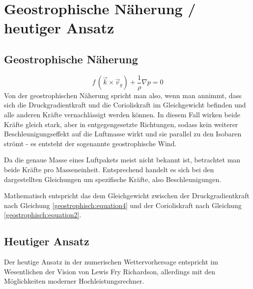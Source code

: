 %
%
%
%
\section{Geostrophische Näherung / heutiger Ansatz
\label{geostrophisch:section:geoNäherung}}
\subsection{Geostrophische Näherung}
\begin{equation}
f\, (\vec{k} \times \vec{v}_g) 
+
\frac{1}{\rho} \nabla p
=
0
\label{geostrophisch:equation5}
\end{equation}
Von der geostrophischen Näherung spricht man also, wenn man annimmt, dass sich die Druckgradientkraft und die Corioliskraft im Gleichgewicht befinden und alle anderen Kräfte vernachlässigt werden können. In diesem Fall wirken beide Kräfte gleich stark, aber in entgegengesetzte Richtungen, sodass kein weiterer Beschleunigungseffekt auf die Luftmasse wirkt und sie parallel zu den Isobaren strömt - es entsteht der sogenannte geostrophische Wind.

\vspace{1em}

Da die genaue Masse eines Luftpakets meist nicht bekannt ist, betrachtet man beide Kräfte pro Masseneinheit. Entsprechend handelt es sich bei den dargestellten Gleichungen um spezifische Kräfte, also Beschleunigungen.

\vspace{1em}

Mathematisch entspricht das dem Gleichgewicht zwischen der Druckgradientkraft nach Gleichung \eqref{geostrophisch:equation4} und der Corioliskraft nach Gleichung \eqref{geostrophisch:equation2}.

\subsection{Heutiger Ansatz}

Der heutige Ansatz in der numerischen Wettervorhersage entspricht im Wesentlichen der Vision von Lewis Fry Richardson, allerdings mit den Möglichkeiten moderner Hochleistungsrechner.

